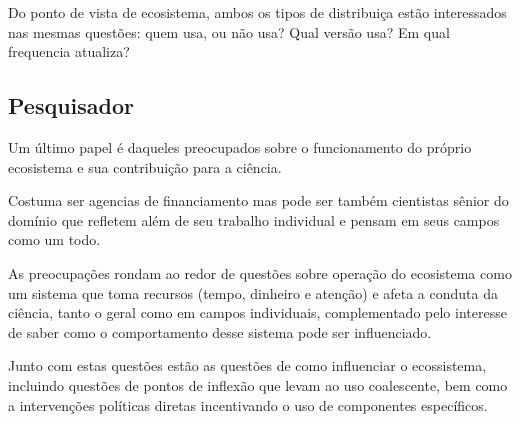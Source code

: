 Do ponto de vista de ecosistema, ambos os tipos de distribuiça
estão interessados nas mesmas questões: quem usa, ou não usa?
Qual versão usa? Em qual frequencia atualiza?

\subsection{Pesquisador}

Um último papel é daqueles preocupados sobre o funcionamento do
próprio ecosistema e sua contribuição para a ciência.

Costuma ser agencias de financiamento mas pode ser também cientistas sênior do
domínio que refletem além de seu trabalho individual e pensam em seus campos
como um todo.

As preocupações rondam ao redor de questões sobre operação do ecosistema como
um sistema que toma recursos (tempo, dinheiro e atenção) e afeta a conduta da
ciência, tanto o geral como em campos individuais, complementado pelo interesse
de saber como o comportamento desse sistema pode ser influenciado.


Junto com estas questões estão as questões de como influenciar o ecossistema,
incluindo questões de pontos de inflexão que levam ao uso coalescente, bem como
a intervenções políticas diretas incentivando o uso de componentes específicos.

%

